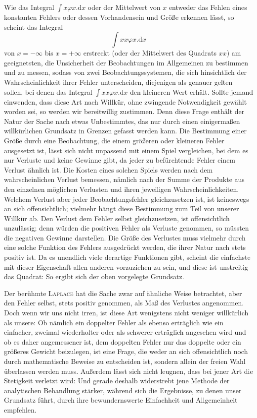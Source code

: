 Wie das Integral \(\int x\varphi x.\mathrm{d}x\) oder der Mittelwert von \(x\) entweder das Fehlen eines konstanten Fehlers oder dessen Vorhandensein und Größe erkennen lässt, so scheint das Integral
\[
\int xx\varphi x.\mathrm{d}x
\]
von \(x=-\infty\) bis \(x=+\infty\) erstreckt (oder der Mittelwert des Quadrats \(xx\)) am geeignetsten, die Unsicherheit der Beobachtungen im Allgemeinen zu bestimmen und zu messen, sodass von zwei Beobachtungssystemen, die sich hinsichtlich der Wahrscheinlichkeit ihrer Fehler unterscheiden, diejenigen als genauer gelten sollen, bei denen das Integral \(\int xx\varphi x.\mathrm{d}x\) den kleineren Wert erhält. Sollte jemand einwenden, dass diese Art nach Willkür, ohne zwingende Notwendigkeit gewählt worden sei, so werden wir bereitwillig zustimmen.
Denn diese Frage enthält der Natur der Sache nach etwas Unbestimmtes, das nur durch einen einigermaßen willkürlichen Grundsatz in Grenzen gefasst werden kann. Die Bestimmung einer Größe durch eine Beobachtung, die einem größeren oder kleineren Fehler ausgesetzt ist, lässt sich nicht unpassend mit einem Spiel vergleichen, bei dem es nur Verluste und keine Gewinne gibt, da jeder zu befürchtende Fehler einem Verlust ähnlich ist. Die Kosten eines solchen Spiels werden nach dem wahrscheinlichen Verlust bemessen, nämlich nach der Summe der Produkte aus den einzelnen möglichen Verlusten und ihren jeweiligen Wahrscheinlichkeiten. Welchem Verlust aber jeder Beobachtungsfehler gleichzusetzen ist, ist keineswegs an sich offensichtlich; vielmehr hängt diese Bestimmung zum Teil von unserer Willkür ab. Den Verlust dem Fehler selbst gleichzusetzen, ist offensichtlich unzulässig; denn würden die positiven Fehler als Verluste genommen, so müssten die negativen Gewinne darstellen. Die Größe des Verlustes muss vielmehr durch eine solche Funktion des Fehlers ausgedrückt werden, die ihrer Natur nach stets positiv ist. Da es unendlich viele derartige Funktionen gibt, scheint die einfachste mit dieser Eigenschaft allen anderen vorzuziehen zu sein, und diese ist unstreitig das Quadrat: So ergibt sich der oben vorgelegte Grundsatz.

Der berühmte \textsc{Laplace} hat die Sache zwar auf ähnliche Weise betrachtet, aber den Fehler selbst, stets positiv genommen, als Maß des Verlustes angenommen. Doch wenn wir uns nicht irren, ist diese Art wenigstens nicht weniger willkürlich als unsere: Ob nämlich ein doppelter Fehler als ebenso erträglich wie ein einfacher, zweimal wiederholter oder als schwerer erträglich angesehen wird und ob es daher angemessener ist, dem doppelten Fehler nur das doppelte oder ein größeres Gewicht beizulegen, ist eine Frage, die weder an sich offensichtlich noch durch mathematische Beweise zu entscheiden ist, sondern allein der freien Wahl überlassen werden muss. Außerdem lässt sich nicht leugnen, dass bei jener Art die Stetigkeit verletzt wird: Und gerade deshalb widerstrebt jene Methode der analytischen Behandlung stärker, während sich die Ergebnisse, zu denen unser Grundsatz führt, durch ihre bewundernswerte Einfachheit und Allgemeinheit empfehlen.

\clearpage
